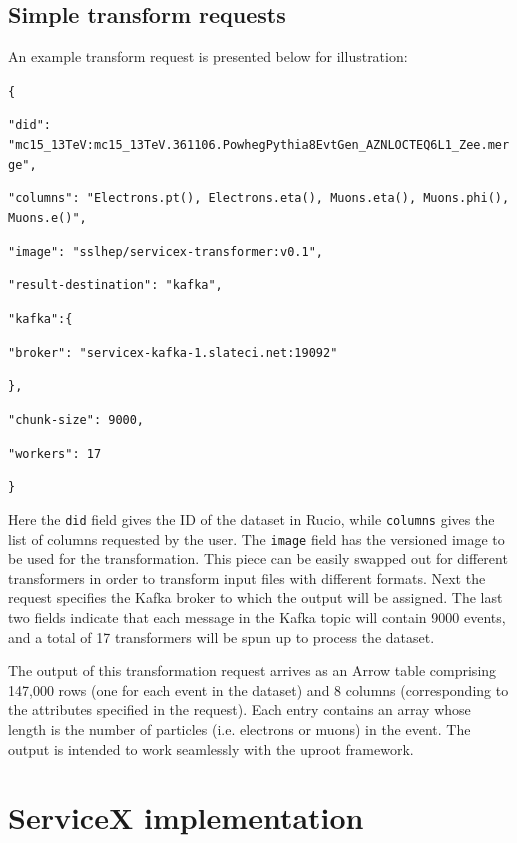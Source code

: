 \documentclass{webofc}
\begin{document}
\subsection{Simple transform requests}
\label{subsec:requests}

An example transform request is presented below for illustration:

\bigskip

{\raggedright \footnotesize
  \texttt{\{}
  
  \texttt{\quad "did": "mc15\_13TeV:mc15\_13TeV.361106.PowhegPythia8EvtGen\_AZNLOCTEQ6L1\_Zee.merge",}
  
  \texttt{\quad "columns": "Electrons.pt(), Electrons.eta(), Muons.eta(), Muons.phi(), Muons.e()",}
  
  \texttt{\quad "image": "sslhep/servicex-transformer:v0.1",}
  
  \texttt{\quad "result-destination": "kafka",}
  
  \texttt{\quad "kafka":\{}
  
  \texttt{\quad \quad "broker": "servicex-kafka-1.slateci.net:19092"}
  
  \texttt{\quad \},}
  
  \texttt{\quad "chunk-size": 9000,}
  
  \texttt{\quad "workers": 17}
  
  \texttt{\}}
}

\bigskip

Here the \texttt{did} field gives the ID of the dataset in Rucio, while \texttt{columns} gives the
list of columns requested by the user. The \texttt{image} field has the versioned image to be used
for the transformation. This piece can be easily swapped out for different transformers in order to
transform input files with different formats. Next the request specifies the Kafka broker to which
the output will be assigned. The last two fields indicate that each message in the Kafka topic will
contain 9000 events, and a total of 17 transformers will be spun up to process the dataset.

The output of this transformation request arrives as an Arrow table comprising 147,000 rows (one
for each event in the dataset) and 8 columns (corresponding to the attributes specified in the
request). Each entry contains an array whose length is the number of particles (i.e. electrons or
muons) in the event. The output is intended to work seamlessly with the uproot framework.

\section{ServiceX implementation}
\label{sec:implement}
\end{document}
